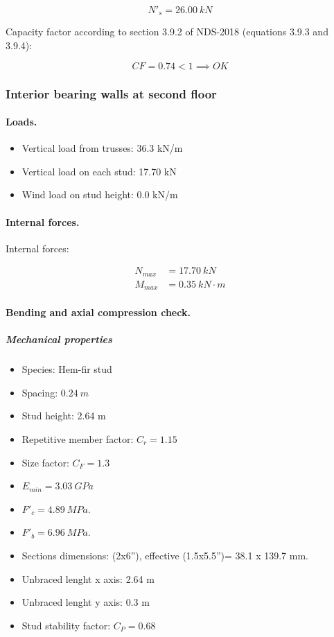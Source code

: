 \begin{equation}
  N'_s= 26.00\ kN
\end{equation}

\noindent Capacity factor according to section 3.9.2 of NDS-2018 (equations 3.9.3 and 3.9.4):

\begin{equation}
  CF= 0.74 < 1 \implies OK
\end{equation}

\subsubsection{Interior bearing walls at second floor}

\paragraph{Loads.}

\begin{itemize}
\item Vertical load from trusses: 36.3 kN/m
\item Vertical load on each stud: 17.70 kN
\item Wind load on stud height: 0.0 kN/m
\end{itemize}

\paragraph{Internal forces.}

\noindent Internal forces:

\begin{align}
  N_{max}&= 17.70\ kN \\
  M_{max}&= 0.35\ kN \cdot m
\end{align}

\paragraph{Bending and axial compression check.}

\subparagraph{Mechanical properties}

\begin{itemize}
\item Species: Hem-fir stud
\item Spacing: $0.24\ m$
\item Stud height: 2.64 m
\item Repetitive member factor: $C_r= 1.15$
\item Size factor: $C_F= 1.3$
\item $E_{min}= 3.03\ GPa$
\item $F'_c= 4.89\ MPa$.
\item $F'_b= 6.96\ MPa$.
\item Sections dimensions: (2x6''), effective (1.5x5.5'')= 38.1 x 139.7  mm.
\item Unbraced lenght x axis: 2.64 m
\item Unbraced lenght y axis: 0.3 m
\item Stud stability factor: $C_P= 0.68$
\end{itemize}

